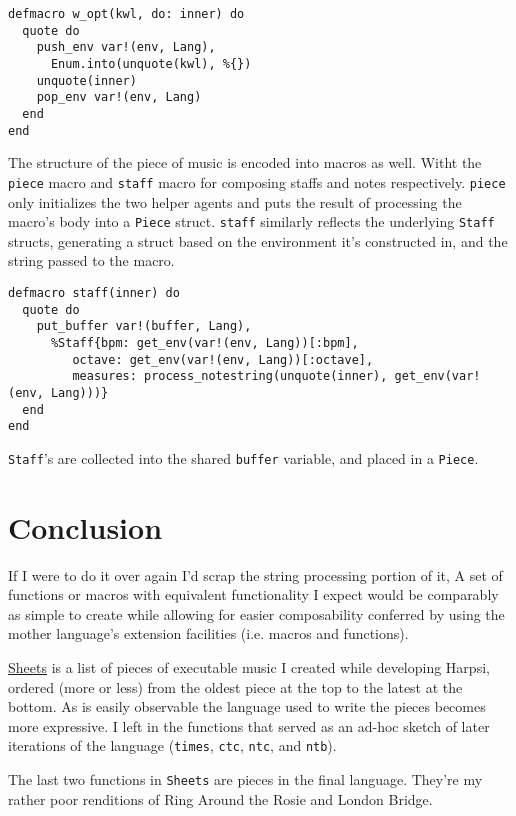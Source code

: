 \documentclass[11pt]{article}
\begin{document}
\begin{verbatim}
defmacro w_opt(kwl, do: inner) do
  quote do
    push_env var!(env, Lang),
      Enum.into(unquote(kwl), %{})
    unquote(inner)
    pop_env var!(env, Lang)
  end
end
\end{verbatim}

The structure of the piece of music is encoded into macros as
well. Witht the \texttt{piece} macro and \texttt{staff} macro for composing
staffs and notes respectively. \texttt{piece} only initializes the two
helper agents and puts the result of processing the macro's body
into a \texttt{Piece} struct. \texttt{staff} similarly reflects the underlying
\texttt{Staff} structs, generating a struct based on the environment it's
constructed in, and the string passed to the macro.

\begin{verbatim}
defmacro staff(inner) do
  quote do
    put_buffer var!(buffer, Lang),
      %Staff{bpm: get_env(var!(env, Lang))[:bpm],
	     octave: get_env(var!(env, Lang))[:octave],
	     measures: process_notestring(unquote(inner), get_env(var!(env, Lang)))}
  end
end
\end{verbatim}

\texttt{Staff}'s are collected into the shared \texttt{buffer} variable, and
placed in a \texttt{Piece}.

\section{Conclusion}
\label{sec-4}
If I were to do it over again I'd scrap the string processing
portion of it, A set of functions or macros with equivalent
functionality I expect would be comparably as simple to create while
allowing for easier composability conferred by using the mother
language's extension facilities (i.e. macros and functions).

\href{lib/sheet.ex}{Sheets} is a list of pieces of executable music I created while
developing Harpsi, ordered (more or less) from the oldest piece at
the top to the latest at the bottom. As is easily observable the
language used to write the pieces becomes more expressive. I left in
the functions that served as an ad-hoc sketch of later iterations of
the language (\texttt{times}, \texttt{ctc}, \texttt{ntc}, and \texttt{ntb}).

The last two functions in \texttt{Sheets} are pieces in the final
language. They're my rather poor renditions of Ring Around the Rosie
and London Bridge.
\end{document}
